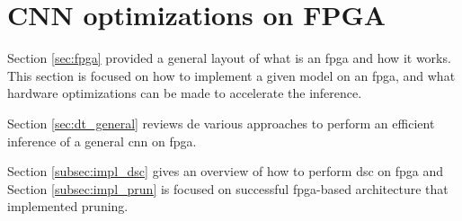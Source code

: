 \section{CNN optimizations on FPGA} \label{sec:opti_dataflow}
%
%
Section \ref{sec:fpga} provided a general layout of what is an \acrshort{fpga} and how it works. This section is focused on how to implement a given model on an \acrshort{fpga}, and what hardware optimizations can be made to accelerate the inference.

Section \ref{sec:dt_general} reviews de various approaches to perform an efficient inference of a general \acrshort{cnn} on \acrshort{fpga}. 

Section \ref{subsec:impl_dsc} gives an overview of how to perform \acrshort{dsc} on \acrshort{fpga} and Section \ref{subsec:impl_prun} is focused on successful \acrshort{fpga}-based architecture that implemented pruning.
%

%

